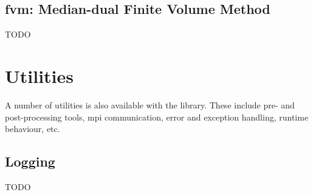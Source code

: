 \subsection{fvm: Median-dual Finite Volume Method}
\label{s:fvm}
TODO

\section{Utilities}
%
A number of utilities is also available with the library. These include 
pre- and post-processing tools, mpi communication, error and exception 
handling, runtime behaviour, etc.

\subsection{Logging} \label{s:utilities-logging}
TODO


